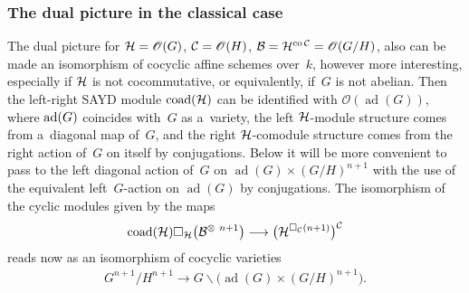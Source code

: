 \documentclass[pdftex]{sigma}
\numberwithin{equation}{section}
\DeclareMathOperator{\ad}{ad}
\DeclareMathOperator{\co}{co}
\begin{document}
\subsubsection{The dual picture in the classical case}\label{section3.5.2}

The dual picture for ${\cal H}=\mathscr{O}(G)$, ${\cal C}=\mathscr{O}(H)$, ${\cal B}={\cal H}^{\co{\cal C}}=\mathscr{O}(G/H)$,
also can be made an isomorphism of cocyclic af\/f\/ine schemes over~$k$, however more interesting,
especially if ${\cal H}$ is not cocommutative, or equivalently, if~$G$ is not abelian.
Then the left-right SAYD module ${\rm coad}({\cal H})$ can be identif\/ied with $\mathscr{O}(\ad(G))$, where ${\rm
ad}(G)$ coincides with~$G$ as a~variety, the left ${\cal H}$-module structure comes from a~diagonal map of~$G$, and the
right ${\cal H}$-comodule structure comes from the right action of~$G$ on itself by conjugations.
Below it will be more convenient to pass to the left diagonal action of~$G$ on $\ad(G)\times (G/H)^{n+1}$ with the
use of the equivalent left~$G$-action on $\ad(G)$ by conjugations.
The isomorphism of the cyclic modules given by the maps
\begin{gather*}%
{\rm coad}({\cal H})\Box_{{\cal H}}\big({\cal B}^{\otimes\ n+1}\big) \longrightarrow \big({\cal H}^{\Box_{{\cal C}}(n+1)}\big)^{{\cal C}}
\end{gather*}
reads now as an isomorphism of cocyclic varieties
\begin{gather*}%
G^{n+1}/H^{n+1}\longrightarrow G\backslash \big(\ad(G)\times (G/H)^{n+1}\big).
\end{gather*}
\end{document}
